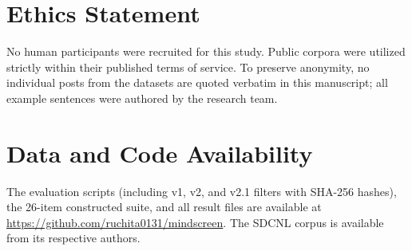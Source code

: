 \documentclass[conference]{IEEEtran}
\begin{document}
\section*{Ethics Statement}
No human participants were recruited for this study. Public corpora were utilized strictly within their published terms of service. To preserve anonymity, no individual posts from the datasets are quoted verbatim in this manuscript; all example sentences were authored by the research team.

\section*{Data and Code Availability}
The evaluation scripts (including v1, v2, and v2.1 filters with SHA-256 hashes), the 26-item constructed suite, and all result files are available at \url{https://github.com/ruchita0131/mindscreen}. The SDCNL corpus is available from its respective authors.



\end{document}
